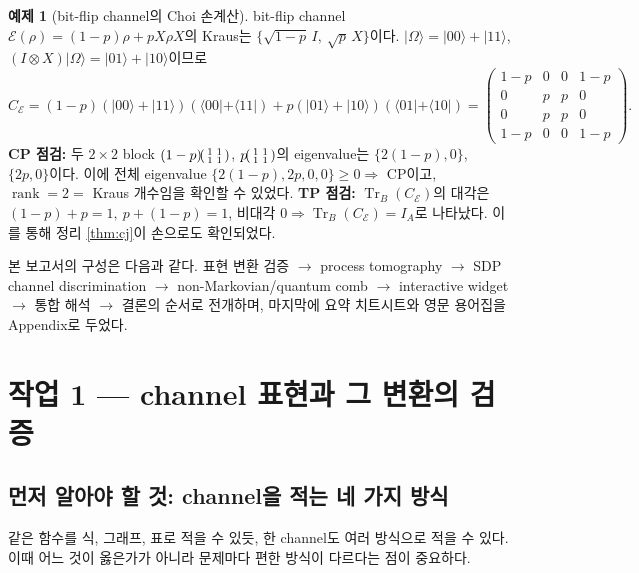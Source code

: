 \documentclass[11pt,a4paper]{article}
\newcommand{\E}{\mathcal{E}}
\newcommand{\Tr}{\operatorname{Tr}}
\newcommand{\rank}{\operatorname{rank}}
\theoremstyle{definition}
\newtheorem{example}{예제}[section]
\theoremstyle{plain}
\theoremstyle{remark}
\begin{document}
\begin{example}[bit-flip channel의 Choi 손계산]\label{ex:bitflip}
bit-flip channel $\E(\rho)=(1-p)\rho+pX\rho X$의 Kraus는 $\{\sqrt{1-p}\,I,\ \sqrt p\,X\}$이다. $|\Omega\rangle=|00\rangle+|11\rangle$, $(I\otimes X)|\Omega\rangle=|01\rangle+|10\rangle$이므로
\[
C_\E=(1-p)(|00\rangle+|11\rangle)(\langle00|+\langle11|)+p(|01\rangle+|10\rangle)(\langle01|+\langle10|)
=\begin{pmatrix}1-p&0&0&1-p\\0&p&p&0\\0&p&p&0\\1-p&0&0&1-p\end{pmatrix}.
\]
\textbf{CP 점검:} 두 $2\times2$ block $(1-p)\!\begin{psmallmatrix}1&1\\1&1\end{psmallmatrix}$, $p\!\begin{psmallmatrix}1&1\\1&1\end{psmallmatrix}$의 eigenvalue는 $\{2(1-p),0\}$, $\{2p,0\}$이다. 이에 전체 eigenvalue $\{2(1-p),2p,0,0\}\ge0\Rightarrow$ CP이고, $\rank=2=$ Kraus 개수임을 확인할 수 있었다. \textbf{TP 점검:} $\Tr_B(C_\E)$의 대각은 $(1-p)+p=1,\ p+(1-p)=1$, 비대각 $0\Rightarrow\Tr_B(C_\E)=I_A$로 나타났다. 이를 통해 정리 \ref{thm:cj}이 손으로도 확인되었다.
\end{example}

본 보고서의 구성은 다음과 같다. 표현 변환 검증 $\to$ process tomography $\to$ SDP channel discrimination $\to$ non-Markovian/quantum comb $\to$ interactive widget $\to$ 통합 해석 $\to$ 결론의 순서로 전개하며, 마지막에 요약 치트시트와 영문 용어집을 Appendix로 두었다.

\section{작업 1 --- channel 표현과 그 변환의 검증}

\subsection{먼저 알아야 할 것: channel을 적는 네 가지 방식}

같은 함수를 식, 그래프, 표로 적을 수 있듯, 한 channel도 여러 방식으로 적을 수 있다. 이때 어느 것이 옳은가가 아니라 문제마다 편한 방식이 다르다는 점이 중요하다.
\end{document}
